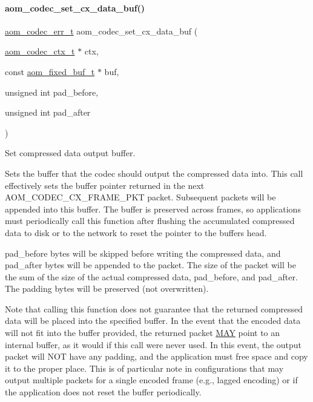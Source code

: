 \paragraph{\texorpdfstring{aom\+\_\+codec\+\_\+set\+\_\+cx\+\_\+data\+\_\+buf()}{aom\_codec\_set\_cx\_data\_buf()}}
{\footnotesize\ttfamily \hyperlink{group__codec_gaaae61e0f8663e6137f1e228757248e7c}{aom\+\_\+codec\+\_\+err\+\_\+t} aom\+\_\+codec\+\_\+set\+\_\+cx\+\_\+data\+\_\+buf (\begin{DoxyParamCaption}\item[{\hyperlink{group__codec_ga9a1d27f9742d9f70783e3c6cb849b5b4}{aom\+\_\+codec\+\_\+ctx\+\_\+t} $\ast$}]{ctx,  }\item[{const \hyperlink{group__encoder_ga85cca9fad6bc25c667f013a39c607174}{aom\+\_\+fixed\+\_\+buf\+\_\+t} $\ast$}]{buf,  }\item[{unsigned int}]{pad\+\_\+before,  }\item[{unsigned int}]{pad\+\_\+after }\end{DoxyParamCaption})}



Set compressed data output buffer. 

Sets the buffer that the codec should output the compressed data into. This call effectively sets the buffer pointer returned in the next A\+O\+M\+\_\+\+C\+O\+D\+E\+C\+\_\+\+C\+X\+\_\+\+F\+R\+A\+M\+E\+\_\+\+P\+KT packet. Subsequent packets will be appended into this buffer. The buffer is preserved across frames, so applications must periodically call this function after flushing the accumulated compressed data to disk or to the network to reset the pointer to the buffer\textquotesingle{}s head.

{\ttfamily pad\+\_\+before} bytes will be skipped before writing the compressed data, and {\ttfamily pad\+\_\+after} bytes will be appended to the packet. The size of the packet will be the sum of the size of the actual compressed data, pad\+\_\+before, and pad\+\_\+after. The padding bytes will be preserved (not overwritten).

Note that calling this function does not guarantee that the returned compressed data will be placed into the specified buffer. In the event that the encoded data will not fit into the buffer provided, the returned packet \hyperlink{rfc2119_MAY}{M\+AY} point to an internal buffer, as it would if this call were never used. In this event, the output packet will N\+OT have any padding, and the application must free space and copy it to the proper place. This is of particular note in configurations that may output multiple packets for a single encoded frame (e.\+g., lagged encoding) or if the application does not reset the buffer periodically.

